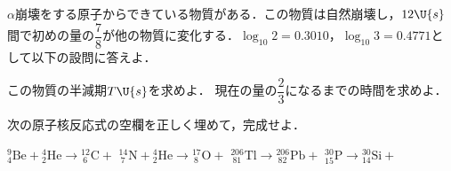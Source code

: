 
\hspace{1zw}$\alpha$崩壊をする原子からできている物質がある．この物質は自然崩壊し，$12\U{s}$間で初めの量の$\dfrac{7}{8}$が他の物質に変化する．$\log_{10}2=0.3010$，$\log_{10}3=0.4771$として以下の設問に答えよ．
\begin{komon}
 この物質の半減期$T\U{s}$を求めよ．
 現在の量の$\dfrac{2}{3}$になるまでの時間を求めよ．
\end{komon}


\hspace{1zw}次の原子核反応式の空欄\framebox[4zw]{\rule{0pt}{1.1zw}}を正しく埋めて，完成せよ．
\begin{komon}
 ${}^9_4\mathrm{Be}+{}^4_2\mathrm{He}\to{}^{12}_{\ 6}\mathrm{C}+$\framebox[4zw]{\rule{0pt}{1.1zw}}
 ${}^{14}_{\ 7}\mathrm{N}+{}^4_2\mathrm{He}\to{}^{17}_{\ 8}\mathrm{O}+$\framebox[4zw]{\rule{0pt}{1.1zw}}
 ${}^{206}_{\ 81}\mathrm{Tl}\to{}^{206}_{\ 82}\mathrm{Pb}+$\framebox[4zw]{\rule{0pt}{1.1zw}}
 ${}^{30}_{15}\mathrm{P}\to{}^{30}_{14}\mathrm{Si}+$\framebox[4zw]{\rule{0pt}{1.1zw}}
\end{komon}



